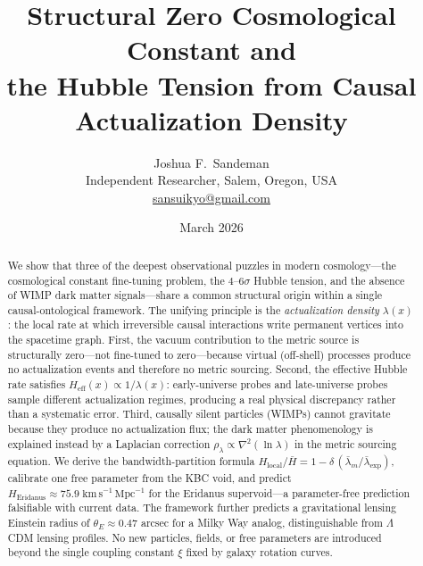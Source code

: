 \documentclass[11pt,twocolumn]{article}
\theoremstyle{plain}
\theoremstyle{remark}
\newcommand{\lmb}{\bar{\lambda}_m}
\newcommand{\lexp}{\bar{\lambda}_{\mathrm{exp}}}
\begin{document}
\title{Structural Zero Cosmological Constant and\\
the Hubble Tension from Causal Actualization Density}

\author{Joshua F.~Sandeman\\
\small Independent Researcher, Salem, Oregon, USA\\
\small \href{mailto:sansuikyo@gmail.com}{sansuikyo@gmail.com}}

\date{March 2026}

\begin{abstract}
We show that three of the deepest observational puzzles in modern
cosmology---the cosmological constant fine-tuning problem, the
$4$--$6\sigma$ Hubble tension, and the absence of WIMP dark matter
signals---share a common structural origin within a single
causal-ontological framework.
The unifying principle is the \emph{actualization density}
$\lambda(x)$: the local rate at which irreversible causal
interactions write permanent vertices into the spacetime graph.
First, the vacuum contribution to the metric source is structurally
zero---not fine-tuned to zero---because virtual (off-shell) processes
produce no actualization events and therefore no metric sourcing.
Second, the effective Hubble rate satisfies $H_{\mathrm{eff}}(x)
\propto 1/\lambda(x)$: early-universe probes and late-universe
probes sample different actualization regimes, producing a real
physical discrepancy rather than a systematic error.
Third, causally silent particles (WIMPs) cannot gravitate because
they produce no actualization flux; the dark matter phenomenology
is explained instead by a Laplacian correction $\rho_\lambda
\propto \nabla^2(\ln\lambda)$ in the metric sourcing equation.
We derive the bandwidth-partition formula
$H_{\mathrm{local}}/\bar{H} = 1 - \delta\,(\lmb/\lexp)$,
calibrate one free parameter from the KBC void, and predict
$H_{\mathrm{Eridanus}} \approx 75.9\;\mathrm{km\,s^{-1}\,Mpc^{-1}}$
for the Eridanus supervoid---a parameter-free prediction
falsifiable with current data.
The framework further predicts a gravitational lensing Einstein
radius of $\theta_E \approx 0.47$ arcsec for a Milky Way analog,
distinguishable from $\Lambda$CDM lensing profiles.
No new particles, fields, or free parameters are introduced beyond
the single coupling constant $\xi$ fixed by galaxy rotation curves.
\end{abstract}

\maketitle
\end{document}
